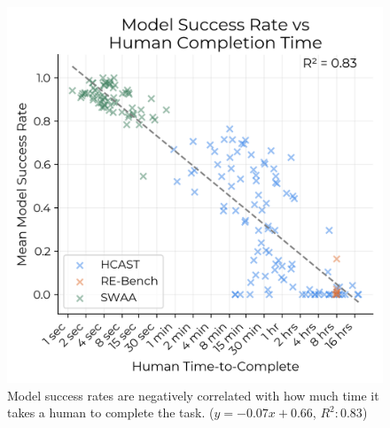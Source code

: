 \documentclass{article}
\begin{document}
\begin{figure}
    \centering
    \includegraphics[width=0.5\linewidth]{plots/success_rates/model_success_rate_vs_human_completion_time.png}
    \caption{Model success rates are negatively correlated with how much time it takes a human to complete the task. ($y=-0.07x+0.66$, $R^2: 0.83$)}
    \label{fig:success_vs_time}
\end{figure}
\end{document}
